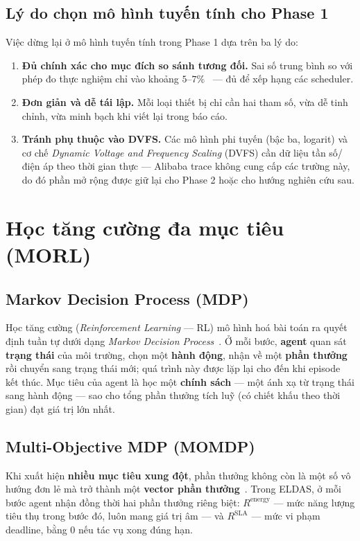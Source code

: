 \subsection{Lý do chọn mô hình tuyến tính cho Phase 1}
Việc dừng lại ở mô hình tuyến tính trong Phase 1 dựa trên ba lý do:
\begin{enumerate}
  \item \textbf{Đủ chính xác cho mục đích so sánh tương đối.} Sai số
        trung bình so với phép đo thực nghiệm chỉ vào khoảng
        $5$--$7\%$~\cite{beloglazov2012energy} --- đủ để xếp hạng các
        scheduler.
  \item \textbf{Đơn giản và dễ tái lập.} Mỗi loại thiết bị chỉ cần hai
        tham số, vừa dễ tinh chỉnh, vừa minh bạch khi viết lại trong
        báo cáo.
  \item \textbf{Tránh phụ thuộc vào DVFS.} Các mô hình phi tuyến (bậc
        ba, logarit) và cơ chế \textit{Dynamic Voltage and Frequency
        Scaling} (DVFS) cần dữ liệu tần số/điện áp theo thời gian
        thực --- Alibaba trace không cung cấp các trường này, do đó
        phần mở rộng được giữ lại cho Phase 2 hoặc cho hướng nghiên
        cứu sau.
\end{enumerate}

\section{Học tăng cường đa mục tiêu (MORL)}
\label{sec:morl}

\subsection{Markov Decision Process (MDP)}
Học tăng cường (\textit{Reinforcement Learning} --- RL) mô hình hoá bài
toán ra quyết định tuần tự dưới dạng \textit{Markov Decision
Process}~\cite{sutton2018reinforcement}. Ở mỗi bước, \textbf{agent} quan
sát \textbf{trạng thái} của môi trường, chọn một \textbf{hành động}, nhận
về một \textbf{phần thưởng} rồi chuyển sang trạng thái mới; quá trình
này được lặp lại cho đến khi episode kết thúc. Mục tiêu của agent là học
một \textbf{chính sách} --- một ánh xạ từ trạng thái sang hành động ---
sao cho tổng phần thưởng tích luỹ (có chiết khấu theo thời gian) đạt giá
trị lớn nhất.

\subsection{Multi-Objective MDP (MOMDP)}
Khi xuất hiện \textbf{nhiều mục tiêu xung đột}, phần thưởng không còn là
một số vô hướng đơn lẻ mà trở thành một \textbf{vector phần
thưởng}~\cite{roijers2013survey, hayes2022practical}. Trong ELDAS, ở
mỗi bước agent nhận đồng thời hai phần thưởng riêng biệt:
$R^{\mathrm{energy}}$ --- mức năng lượng tiêu thụ trong bước đó, luôn
mang giá trị âm --- và $R^{\mathrm{SLA}}$ --- mức vi phạm deadline,
bằng 0 nếu tác vụ xong đúng hạn.

